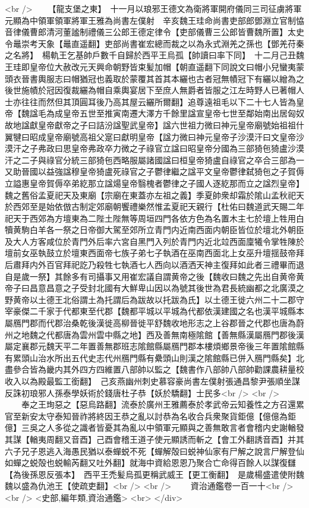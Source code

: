 <br />
　　【龍支堡之東】　十一月以琅邪王德文為衛將軍開府儀同三司征虜將軍元顯為中領軍領軍將軍王雅為尚書左僕射　辛亥魏王珪命尚書吏部郎鄧淵立官制恊音律儀曹郎清河董謐制禮儀三公郎王德定律令【吏部儀曹三公郎皆曹魏所置】太史令鼂崇考天象【鼂直遥翻】吏部尚書崔宏總而裁之以為永式淵羌之孫也【鄧羌苻秦之名將】　楊軌王乞基帥戶數千自歸於西平王烏孤【帥讀曰率下同】　十二月己丑魏王珪即皇帝位大赦改元天興命朝野皆束髪加帽【朝直遥翻下同說文曰帽小兒蠻夷蒙頭衣晉書輿服志曰帽猶冠也義取於蒙覆其首其本纚也古者冠無幘冠下有纚以繒為之後世施幘於冠因復裁纚為帽自乘輿宴居下至庶人無爵者皆服之江左時野人已著帽人士亦往往而然但其頂圓耳後乃高其屋云纚所爾翻】追尊遠祖毛以下二十七人皆為皇帝【魏諡毛為成皇帝五世至推寅南遷大澤方千餘里諡宣皇帝七世至鄰始南出居匈奴故地諡獻皇帝獻帝之子曰詰汾諡聖武皇帝】諡六世祖力微曰神元皇帝廟號始祖祖什翼犍曰昭成皇帝廟號高祖父寔曰獻明皇帝【諡力微曰神元皇帝子沙漠汗曰文皇帝沙漠汗之子弗政曰思皇帝弗政卒力微之子祿官立諡曰昭皇帝分國為三部猗㐌猗盧沙漠汗之二子與祿官分統三部猗㐌西略服屬諸國諡曰桓皇帝猗盧自祿官之卒合三部為一又助晉國以益強諡穆皇帝猗盧死祿官之子鬱律繼之諡平文皇帝鬱律弑猗㐌之子賀傉立謚惠皇帝賀傉卒弟紇那立諡煬皇帝翳槐者鬱律之子國人逐紇那而立之諡烈皇帝】魏之舊俗孟夏祀天及東廟【宗廟在東蓋亦左祖之義】季夏帥衆却霜於隂山孟秋祀天於西郊至是始依倣古制定郊廟朝饗禮樂然惟孟夏祀天親行【杜佑曰魏道武天賜二年祀天于西郊為方壇東為二陛土陛無等周垣四門各依方色為名置木主七於壇上牲用白犢黄駒白羊各一祭之日帝御大駕至郊所立青門内近南西面内朝臣皆位於壇北外朝臣及大人方客咸位於青門外后率六宮自黑門入列於青門内近北竝西面廩犧令掌牲陳於壇前女巫執鼓立於壇東西面帝七族子弟七子執酒在巫南西面北上女巫升壇揺鼓帝拜后肅拜内外百官拜祀訖乃殺牲七執酒七人西向以酒洒天神主復拜如此者三禮畢而退自是歲一祭】其餘多有司攝事又用崔宏議自謂黄帝之後【魏收曰魏之先出自黄帝黄帝子曰昌意昌意之子受封北國有大鮮卑山因以為號其後世為君長統幽都之北廣漠之野黄帝以土德王北俗謂土為托謂后為跋故以托跋為氏】以土德王徙六州二十二郡守宰豪傑二千家于代都東至代郡【魏都平城以平城為代都依漢建國之名也漢平城縣本屬鴈門郡而代郡治桑乾後漢徙高柳晉徙平舒魏收地形志之上谷郡晉之代郡也唐為蔚州之地魏之代都唐為雲州雲中縣之地】西及善無南極隂館【善無縣漢屬鴈門郡後漢屬定襄郡元魏天平二年置善無郡班志隂館縣屬鴈門郡本樓煩鄉景帝後三年置隂館縣有累頭山治水所出五代史志代州鴈門縣有纍頭山則漢之隂館縣已併入鴈門縣矣】北盡參合皆為畿内其外四方四維置八部帥以監之【魏書作八部帥八部帥勸課農耕量校收入以為殿最監工銜翻】　己亥燕幽州刺史慕容豪尚書左僕射張通昌黎尹張順坐謀反誅初琅邪人孫泰學妖術於錢唐杜子恭【妖於驕翻】士民多<br />
<br />
　　奉之王珣惡之【惡烏路翻】流泰於廣州王雅薦泰於孝武帝云知養性之方召還累官至新安太守泰知晉祚將終因王恭之亂以討恭為名收合兵衆聚貨鉅億【億億為鉅億】三吳之人多從之識者皆憂其為亂以中領軍元顯與之善無敢言者會稽内史謝輶發其謀【輶夷周翻又音酉】己酉會稽王道子使元顯誘而斬之【會工外翻誘音酉】并其六子兄子恩逃入海愚民猶以泰蟬蜕不死【蟬解殻曰蜕神仙家有尸解之說言尸解登仙如蟬之蜕殻也蜕輸芮翻又吐外翻】就海中資給恩恩乃聚合亡命得百餘人以謀復讎【為後孫恩反張本】　西平王禿髪烏孤更稱武威王【更工衡翻】　是歲楊盛遣使附魏魏以盛為仇池王【使疏吏翻】<br />
<br />
　　資治通鑑卷一百一十<br />
<br />
<史部,編年類,資治通鑑>  <br>
   </div> 

